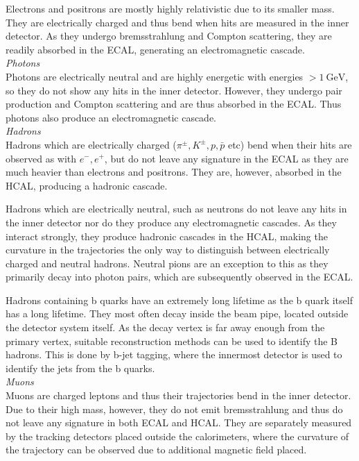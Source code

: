 \documentclass[a4paper]{report}
\numberwithin{equation}{section}
\begin{document}
Electrons and positrons are mostly highly relativistic due to its smaller mass. They are electrically charged and thus bend when 
hits are measured in the inner detector. As they undergo bremsstrahlung and Compton scattering, they are readily absorbed in the ECAL, 
generating an electromagnetic cascade. \\

\noindent \textit{Photons} \\

Photons are electrically neutral and are highly energetic with energies $> \SI{1}{\giga\electronvolt}$, so they do not show any hits
 in the inner detector. However, they undergo pair production and Compton scattering and are thus absorbed in the ECAL. Thus photons 
 also produce an electromagnetic cascade. \\

 \noindent \textit{Hadrons} \\

 Hadrons which are electrically charged ($\pi^\pm, K^\pm, p, \bar{p}$ etc) bend when their hits are observed as with $e^-, e^+$, 
but do not leave any signature in the ECAL as they are much heavier than electrons and positrons. They are, however, absorbed in the HCAL, 
producing a hadronic cascade. \par 

Hadrons which are electrically neutral, such as neutrons do not leave any hits in the inner detector nor do they produce 
any electromagnetic cascades. As they interact strongly, they produce hadronic cascades in the HCAL, making the curvature in the trajectories
the only way to distinguish between electrically charged and neutral hadrons. Neutral pions are an exception to this as they primarily decay 
into photon pairs, which are subsequently observed in the ECAL. \par 

Hadrons containing b quarks have an extremely long lifetime as the b quark itself has a long lifetime. They most often decay inside the beam pipe, located 
outside the detector system itself. As the decay vertex is far away enough from the primary vertex, suitable reconstruction methods can be used to identify the 
B hadrons. This is done by b-jet tagging, where the innermost detector is used to identify the jets from the b quarks. \\

\noindent \textit{Muons} \\

Muons are charged leptons and thus their trajectories bend in the inner detector. Due to their high mass, however, they do not emit bremsstrahlung and thus 
do not leave any signature in both ECAL and HCAL. They are separately measured by the tracking detectors placed outside the calorimeters, where the curvature 
of the trajectory can be observed due to additional magnetic field placed. \\
\end{document}
